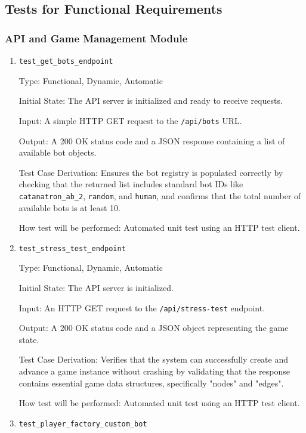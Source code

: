 \documentclass[12pt, titlepage]{article}
\begin{document}
\subsection{Tests for Functional Requirements}

\subsubsection{API and Game Management Module}

\begin{enumerate}

\item
\texttt{test\_get\_bots\_endpoint}

Type: Functional, Dynamic, Automatic

Initial State: The API server is initialized and ready to receive requests.

Input: A simple HTTP GET request to the \texttt{/api/bots} URL.

Output: A 200 OK status code and a JSON response containing a list of available bot objects.

Test Case Derivation: Ensures the bot registry is populated correctly by checking that the returned list includes standard bot IDs like \texttt{catanatron\_ab\_2}, \texttt{random}, and \texttt{human}, and confirms that the total number of available bots is at least 10.

How test will be performed: Automated unit test using an HTTP test client.

\item
\texttt{test\_stress\_test\_endpoint}

Type: Functional, Dynamic, Automatic

Initial State: The API server is initialized.

Input: An HTTP GET request to the \texttt{/api/stress-test} endpoint.

Output: A 200 OK status code and a JSON object representing the game state.

Test Case Derivation: Verifies that the system can successfully create and advance a game instance without crashing by validating that the response contains essential game data structures, specifically "nodes" and "edges".

How test will be performed: Automated unit test using an HTTP test client.

\item
\texttt{test\_player\_factory\_custom\_bot}


\end{enumerate}
\end{document}
